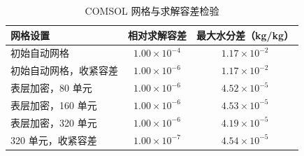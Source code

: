 \begin{table}[H]
\centering
\caption{COMSOL 网格与求解容差检验}\label{tab:q4comsolmesh}
\begin{tabular}{lcc}
\toprule
网格设置 & 相对求解容差 & 最大水分差（kg/kg）\\
\midrule
初始自动网格 & $1.00\times10^{-4}$ & $1.17\times10^{-2}$\\
初始自动网格，收紧容差 & $1.00\times10^{-6}$ & $1.17\times10^{-2}$\\
表层加密，80 单元 & $1.00\times10^{-6}$ & $4.52\times10^{-5}$\\
表层加密，160 单元 & $1.00\times10^{-6}$ & $4.53\times10^{-5}$\\
表层加密，320 单元 & $1.00\times10^{-6}$ & $4.19\times10^{-5}$\\
320 单元，收紧容差 & $1.00\times10^{-7}$ & $4.54\times10^{-5}$\\
\bottomrule
\end{tabular}
\end{table}
